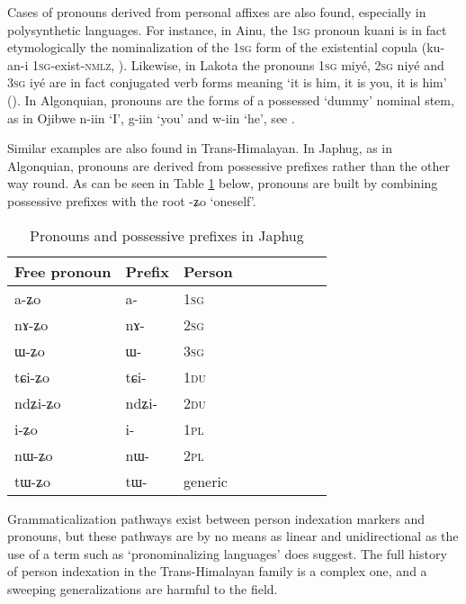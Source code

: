 \documentclass[oldfontcommands,oneside,a4paper,11pt]{article}
\newcommand{\ipa}[1]{{\phon \mbox{#1}}} %
\begin{document}
Cases of pronouns derived from personal affixes are also found, especially in polysynthetic languages. For instance, in Ainu, the \textsc{1sg} pronoun \ipa{kuani} is in fact etymologically the nominalization of the \textsc{1sg} form of the existential copula (\ipa{ku-an-i} \textsc{1sg}-exist-\textsc{nmlz}, \citealt[31]{shibatani90japan}). Likewise, in Lakota the pronouns \textsc{1sg} \ipa{miyé}, \textsc{2sg} \ipa{niyé} and \textsc{3sg} \ipa{iyé} are in fact conjugated verb forms meaning `it is him, it is you, it is him' (\citealt[707;754]{ullrich08}). In Algonquian,   pronouns are the forms of a possessed `dummy' nominal stem, as in Ojibwe \ipa{n-iin} `I', \ipa{g-iin} `you' and \ipa{w-iin} `he', see \citet{valentine01grammar}. 

Similar examples are also found in Trans-Himalayan. In Japhug, as in Algonquian, pronouns are derived from possessive prefixes rather than the other way round. As can be seen in Table \ref{tab:pronoun} below, pronouns are built by combining possessive prefixes with the root \ipa{-ʑo} `oneself'. 

 \begin{table}[H] \centering
\caption{Pronouns and possessive prefixes in Japhug}\label{tab:pronoun}
\begin{tabular}{lllllllll} 
\toprule
 Free pronoun & Prefix & Person\\
\midrule
 \ipa{a-ʑo}  &	\ipa{a-}  &		1\textsc{sg} \\
\ipa{nɤ-ʑo}  &	\ipa{nɤ-}  &			2\textsc{sg}\\
\ipa{ɯ-ʑo}  &	\ipa{ɯ-}  &			3\textsc{sg}\\
\midrule
\ipa{tɕi-ʑo}  &	\ipa{tɕi-}  &			1\textsc{du} \\
\ipa{ndʑi-ʑo}  &	\ipa{ndʑi-}  &		2\textsc{du} \\	
\midrule
\ipa{i-ʑo}    &	\ipa{i-}  &			1\textsc{pl} \\
\ipa{nɯ-ʑo}   &	\ipa{nɯ-}  &			2\textsc{pl} \\
\midrule
\ipa{tɯ-ʑo} & \ipa{tɯ-}   &  generic\\
\bottomrule
\end{tabular}
\end{table}

 Grammaticalization pathways exist between person indexation markers and pronouns, but these pathways are by no means as linear and unidirectional as the use of a term such as `pronominalizing languages' does suggest. The full history of person indexation in the Trans-Himalayan family is a complex one, and a sweeping generalizations are harmful to the field.
\end{document}
